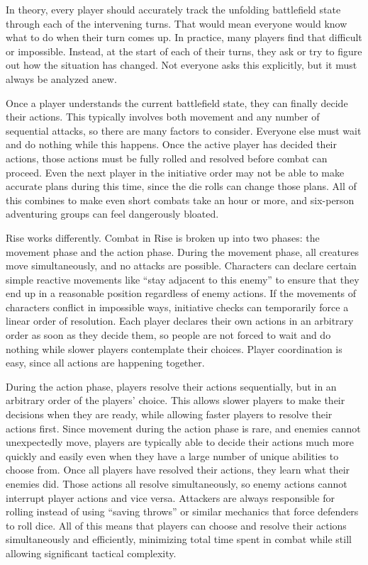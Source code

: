     In theory, every player should accurately track the unfolding battlefield state through each of the intervening turns.
    That would mean everyone would know what to do when their turn comes up.
    In practice, many players find that difficult or impossible.
    Instead, at the start of each of their turns, they ask or try to figure out how the situation has changed.
    Not everyone asks this explicitly, but it must always be analyzed anew.

    Once a player understands the current battlefield state, they can finally decide their actions.
    This typically involves both movement and any number of sequential attacks, so there are many factors to consider.
    Everyone else must wait and do nothing while this happens.
    Once the active player has decided their actions, those actions must be fully rolled and resolved before combat can proceed.
    Even the next player in the initiative order may not be able to make accurate plans during this time, since the die rolls can change those plans.
    All of this combines to make even short combats take an hour or more, and six-person adventuring groups can feel dangerously bloated.

    Rise works differently.
    Combat in Rise is broken up into two phases: the movement phase and the action phase.
    During the movement phase, all creatures move simultaneously, and no attacks are possible.
    Characters can declare certain simple reactive movements like ``stay adjacent to this enemy'' to ensure that they end up in a reasonable position regardless of enemy actions.
    If the movements of characters conflict in impossible ways, initiative checks can temporarily force a linear order of resolution.
    Each player declares their own actions in an arbitrary order as soon as they decide them, so people are not forced to wait and do nothing while slower players contemplate their choices.
    Player coordination is easy, since all actions are happening together.

    During the action phase, players resolve their actions sequentially, but in an arbitrary order of the players' choice.
    This allows slower players to make their decisions when they are ready, while allowing faster players to resolve their actions first.
    Since movement during the action phase is rare, and enemies cannot unexpectedly move, players are typically able to decide their actions much more quickly and easily even when they have a large number of unique abilities to choose from.
    Once all players have resolved their actions, they learn what their enemies did.
    Those actions all resolve simultaneously, so enemy actions cannot interrupt player actions and vice versa.
    Attackers are always responsible for rolling instead of using ``saving throws'' or similar mechanics that force defenders to roll dice.
    All of this means that players can choose and resolve their actions simultaneously and efficiently, minimizing total time spent in combat while still allowing significant tactical complexity.

